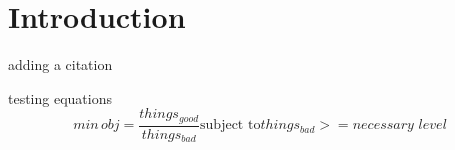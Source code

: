 \section{Introduction}

adding a citation \cite{Pouransari_2014}

testing equations
\begin{equation}
min \, obj= \frac{things_{good}}{things_{bad}}
\text{subject to} things_{bad}>=necessary\,\, level
\end{equation}